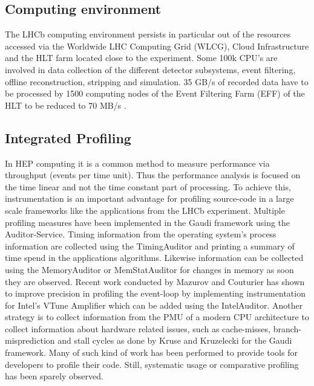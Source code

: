 \documentclass[a4paper]{jpconf}
\begin{document}
\subsection{Computing environment}
\label{sec:computing_environment}

The LHCb computing environment persists in particular out of the resources accessed via the Worldwide LHC Computing Grid (WLCG), Cloud Infrastructure and the HLT farm located close to the experiment. Some 100k CPU's are involved in  data collection of the different detector subsystems, event filtering, offline reconstruction, stripping and simulation. 35 GB/s of recorded data have to be processed by 1500 computing nodes of the Event Filtering Farm (EFF) of the HLT to be reduced to 70 MB/s \cite{lhcb_hlt_opt}.

\subsection{Integrated Profiling}
\label{sec:integrated_profiling}

In HEP computing it is a common method to measure performance via throughput (events per time unit). Thus the performance analysis is focused on the time linear and not the time constant part of processing. To achieve this, instrumentation is an important advantage for profiling source-code in a large scale frameworks like the applications from the LHCb experiment. Multiple profiling measures have been implemented in the Gaudi framework using the Auditor-Service.
\newline
Timing information from the operating system's process information are collected using the TimingAuditor and printing a summary of time spend in the applications algorithms. Likewise information can be collected using the MemoryAuditor or MemStatAuditor for changes in memory as soon they are observed. Recent work \cite{intel_auditor} conducted by Mazurov and Couturier has shown to improve precision in profiling the event-loop by implementing instrumentation for Intel's  VTune Amplifier which can be added using the IntelAuditor. Another strategy is to collect information from the PMU of a modern CPU architecture to collect information about hardware related issues, such as cache-misses, branch-misprediction and stall cycles as done by Kruse and Kruzelecki \cite{monitoring} for the Gaudi framework.
\newline
Many of such kind of work has been performed to provide tools for developers to profile their code. Still, systematic usage or comparative profiling has been sparely observed.
\end{document}
